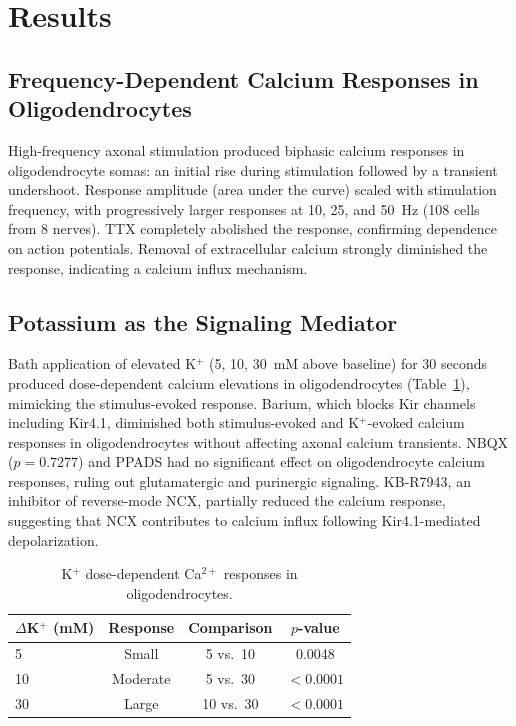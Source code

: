 \documentclass[12pt]{article}
\begin{document}
\section{Results}

\subsection{Frequency-Dependent Calcium Responses in Oligodendrocytes}

High-frequency axonal stimulation produced biphasic calcium responses in oligodendrocyte somas: an initial rise during stimulation followed by a transient undershoot. Response amplitude (area under the curve) scaled with stimulation frequency, with progressively larger responses at 10, 25, and 50~Hz (108 cells from 8 nerves). TTX completely abolished the response, confirming dependence on action potentials. Removal of extracellular calcium strongly diminished the response, indicating a calcium influx mechanism.

\subsection{Potassium as the Signaling Mediator}

Bath application of elevated K$^+$ (5, 10, 30~mM above baseline) for 30 seconds produced dose-dependent calcium elevations in oligodendrocytes (Table~\ref{tab:calcium}), mimicking the stimulus-evoked response. Barium, which blocks Kir channels including Kir4.1, diminished both stimulus-evoked and K$^+$-evoked calcium responses in oligodendrocytes without affecting axonal calcium transients. NBQX ($p = 0.7277$) and PPADS had no significant effect on oligodendrocyte calcium responses, ruling out glutamatergic and purinergic signaling. KB-R7943, an inhibitor of reverse-mode NCX, partially reduced the calcium response, suggesting that NCX contributes to calcium influx following Kir4.1-mediated depolarization.

\begin{table}[ht]
\centering
\caption{K$^+$ dose-dependent Ca$^{2+}$ responses in oligodendrocytes.}
\label{tab:calcium}
\begin{tabular}{lccc}
\toprule
$\Delta$K$^+$ (mM) & Response & Comparison & $p$-value \\
\midrule
5 & Small & 5 vs.\ 10 & 0.0048 \\
10 & Moderate & 5 vs.\ 30 & $< 0.0001$ \\
30 & Large & 10 vs.\ 30 & $< 0.0001$ \\
\bottomrule
\end{tabular}
\end{table}
\end{document}
